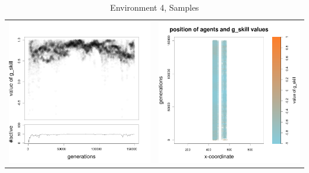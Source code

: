 \documentclass[a4paper,10pt]{article}
\begin{document}
\begin{table}[H]
\caption{Environment 4, Samples}
\centering
\begin{tabular}{cc}
\includegraphics[width=\imgSize]{../images/5StaticEnv/Gplot17_staticEnv4}&\includegraphics[width=\imgSize]{../images/5StaticEnv/Gplot17Static_staticEnv4}\\

\end{tabular}
\end{table}
\end{document}
